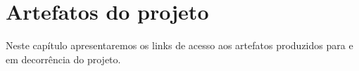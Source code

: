 \chapter{Artefatos do projeto}
Neste capítulo apresentaremos os links de acesso aos artefatos produzidos para e em decorrência do projeto.
%
%
%
%
%
